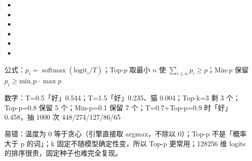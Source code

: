 \documentclass[UTF8,10.5pt,openany]{ctexbook}
\newcommand{\meta}[2]{\vspace{1pt}\begingroup\sloppy\raggedright{\sffamily\footnotesize\color{grayt}#1：#2}\par\endgroup}
\begin{document}
\begin{itemize}[leftmargin=1.35em,itemsep=2.2pt,topsep=1pt,parsep=0pt]
\item \begingroup{}\endgroup
\item \begingroup{}\endgroup
\item \begingroup{}\endgroup
\item \begingroup{}\endgroup
\item \begingroup{}\endgroup
\item \begingroup{}\endgroup
\end{itemize}
\meta{公式}{$p_{i}=\operatorname{softmax}(\text{logit}_{i}/T)$；Top-$p$ 取最小 $n$ 使 $\sum_{i\le n}p_{i}\ge p$；Min-$p$ 保留 $p_{i}\ge\text{min\_p}\cdot\max p$}
\meta{数字}{T=0.5「好」0.544；T=1.5「好」0.235、猫 0.004；Top-k=3 剩 3 个；Top-p=0.8 保留 5 个；Min-p=0.1 保留 7 个；T=0.7+Top-p=0.9 时「好」0.458，抽 1000 次 448/274/127/86/65}
\meta{易错}{温度为 0 等于贪心（引擎直接取 argmax，不除以 0）；Top-p 不是「概率大于 p 的词」；k 固定不随模型确定性变，所以 Top-p 更常用；128256 维 logits 的排序很贵，固定种子也难完全复现。}
\end{document}
